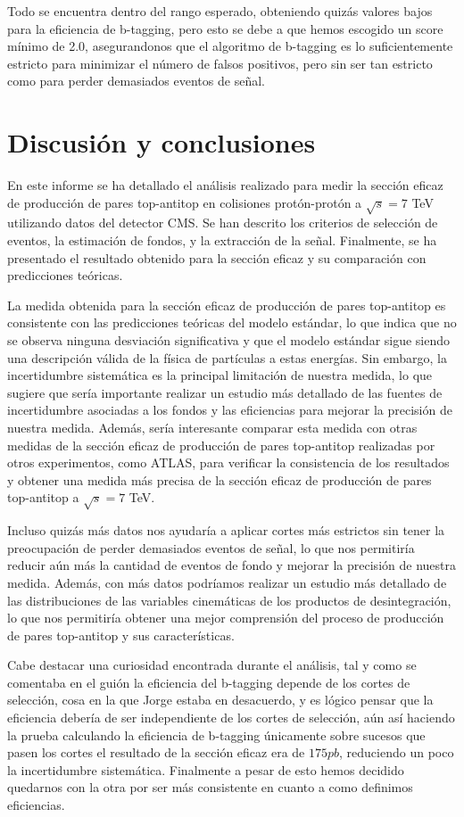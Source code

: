 \documentclass[9pt,a4paper,twocolumn,twoside]{rho-class/rho}
\begin{document}
Todo se encuentra dentro del rango esperado, obteniendo quizás valores bajos para la eficiencia de b-tagging, pero esto se debe a que hemos escogido un score mínimo de 2.0, asegurandonos que el algoritmo de b-tagging es lo suficientemente estricto para minimizar el número de falsos positivos, pero sin ser tan estricto como para perder demasiados eventos de señal.

\section{Discusión y conclusiones}
En este informe se ha detallado el análisis realizado para medir la sección eficaz de producción de pares top-antitop en colisiones protón-protón a $\sqrt{s} = 7$ TeV utilizando datos del detector CMS. Se han descrito los criterios de selección de eventos, la estimación de fondos, y la extracción de la señal. Finalmente, se ha presentado el resultado obtenido para la sección eficaz y su comparación con predicciones teóricas.

La medida obtenida para la sección eficaz de producción de pares top-antitop es consistente con las predicciones teóricas del modelo estándar, lo que indica que no se observa ninguna desviación significativa y que el modelo estándar sigue siendo una descripción válida de la física de partículas a estas energías. Sin embargo, la incertidumbre sistemática es la principal limitación de nuestra medida, lo que sugiere que sería importante realizar un estudio más detallado de las fuentes de incertidumbre asociadas a los fondos y las eficiencias para mejorar la precisión de nuestra medida. Además, sería interesante comparar esta medida con otras medidas de la sección eficaz de producción de pares top-antitop realizadas por otros experimentos, como ATLAS, para verificar la consistencia de los resultados y obtener una medida más precisa de la sección eficaz de producción de pares top-antitop a $\sqrt{s} = 7$ TeV.

Incluso quizás más datos nos ayudaría a aplicar cortes más estrictos sin tener la preocupación de perder demasiados eventos de señal, lo que nos permitiría reducir aún más la cantidad de eventos de fondo y mejorar la precisión de nuestra medida. Además, con más datos podríamos realizar un estudio más detallado de las distribuciones de las variables cinemáticas de los productos de desintegración, lo que nos permitiría obtener una mejor comprensión del proceso de producción de pares top-antitop y sus características.

Cabe destacar una curiosidad encontrada durante el análisis, tal y como se comentaba en el guión la eficiencia del b-tagging depende de los cortes de selección, cosa en la que Jorge estaba en desacuerdo, y es lógico pensar que la eficiencia debería de ser independiente de los cortes de selección, aún así haciendo la prueba calculando la eficiencia de b-tagging únicamente sobre sucesos que pasen los cortes el resultado de la sección eficaz era de $175 pb$, reduciendo un poco la incertidumbre sistemática. Finalmente a pesar de esto hemos decidido quedarnos con la otra por ser más consistente en cuanto a como definimos eficiencias.

\nocite{*}

\printbibliography
\end{document}
